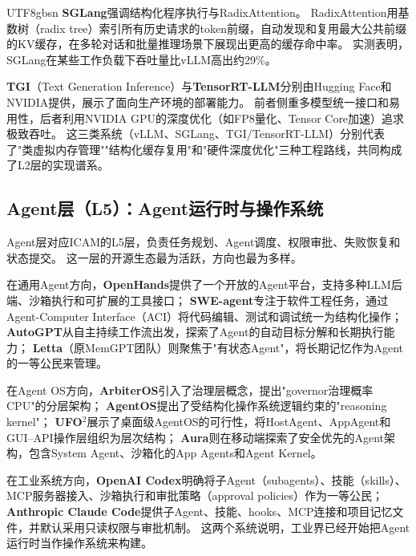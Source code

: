 \documentclass[11pt,a4paper]{article}
\begin{document}
\begin{CJK*}{UTF8}{gbsn}
\textbf{SGLang}强调结构化程序执行与RadixAttention\cite{sglang2024,sglang_docs_2026}。
RadixAttention用基数树（radix tree）索引所有历史请求的token前缀，自动发现和复用最大公共前缀的KV缓存，在多轮对话和批量推理场景下展现出更高的缓存命中率。
实测表明，SGLang在某些工作负载下吞吐量比vLLM高出约29\%\cite{sglang2024}。

\textbf{TGI}（Text Generation Inference）与\textbf{TensorRT-LLM}分别由Hugging Face和NVIDIA提供，展示了面向生产环境的部署能力\cite{tgi_docs_2026,tensorrtllm_docs_2026}。
前者侧重多模型统一接口和易用性，后者利用NVIDIA GPU的深度优化（如FP8量化、Tensor Core加速）追求极致吞吐。
这三类系统（vLLM、SGLang、TGI/TensorRT-LLM）分别代表了"类虚拟内存管理""结构化缓存复用"和"硬件深度优化"三种工程路线，共同构成了L2层的实现谱系。

\subsection{Agent层（L5）：Agent运行时与操作系统}

Agent层对应ICAM的L5层，负责任务规划、Agent调度、权限审批、失败恢复和状态提交。
这一层的开源生态最为活跃，方向也最为多样。

在通用Agent方向，\textbf{OpenHands}提供了一个开放的Agent平台，支持多种LLM后端、沙箱执行和可扩展的工具接口\cite{openhands_paper_2025}；
\textbf{SWE-agent}专注于软件工程任务，通过Agent-Computer Interface（ACI）将代码编辑、测试和调试统一为结构化操作\cite{sweagent2024}；
\textbf{AutoGPT}从自主持续工作流出发，探索了Agent的自动目标分解和长期执行能力\cite{autogpt_platform_2026}；
\textbf{Letta}（原MemGPT团队）则聚焦于"有状态Agent"，将长期记忆作为Agent的一等公民来管理\cite{letta_stateful_2026}。

在Agent OS方向，\textbf{ArbiterOS}引入了治理层概念，提出"governor治理概率CPU"的分层架构\cite{arbiteros2025}；
\textbf{AgentOS}提出了受结构化操作系统逻辑约束的"reasoning kernel"\cite{agentos2025}；
\textbf{UFO$^2$}展示了桌面级AgentOS的可行性，将HostAgent、AppAgent和GUI--API操作层组织为层次结构\cite{ufo2_2025}；
\textbf{Aura}则在移动端探索了安全优先的Agent架构，包含System Agent、沙箱化的App Agents和Agent Kernel\cite{aura2025}。

在工业系统方向，\textbf{OpenAI Codex}明确将子Agent（subagents）、技能（skills）、MCP服务器接入、沙箱执行和审批策略（approval policies）作为一等公民\cite{openai_codex_overview_2026,openai_codex_subagents_2026,openai_codex_skills_2026,openai_codex_sandbox_2026,openai_codex_approvals_2026}；
\textbf{Anthropic Claude Code}提供子Agent、技能、hooks、MCP连接和项目记忆文件，并默认采用只读权限与审批机制\cite{anthropic_claudecode_overview_2026,anthropic_claudecode_security_2026}。
这两个系统说明，工业界已经开始把Agent运行时当作操作系统来构建。


\end{CJK*}
\end{document}
